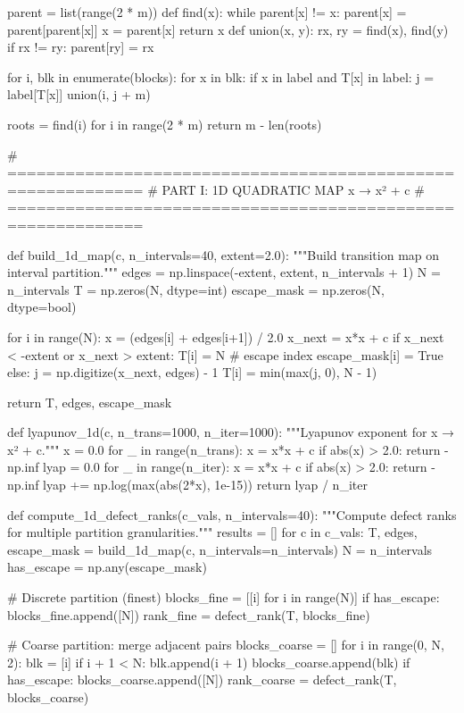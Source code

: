 {{{{{{{{{{{{{    parent = list(range(2 * m))
    def find(x):
        while parent[x] != x:
            parent[x] = parent[parent[x]]
            x = parent[x]
        return x
    def union(x, y):
        rx, ry = find(x), find(y)
        if rx != ry:
            parent[ry] = rx
    
    for i, blk in enumerate(blocks):
        for x in blk:
            if x in label and T[x] in label:
                j = label[T[x]]
                union(i, j + m)
    
    roots = {find(i) for i in range(2 * m)}
    return m - len(roots)


# ============================================================
# PART I: 1D QUADRATIC MAP  x → x² + c
# ============================================================

def build_1d_map(c, n_intervals=40, extent=2.0):
    """Build transition map on interval partition."""
    edges = np.linspace(-extent, extent, n_intervals + 1)
    N = n_intervals
    T = np.zeros(N, dtype=int)
    escape_mask = np.zeros(N, dtype=bool)
    
    for i in range(N):
        x = (edges[i] + edges[i+1]) / 2.0
        x_next = x*x + c
        if x_next < -extent or x_next > extent:
            T[i] = N  # escape index
            escape_mask[i] = True
        else:
            j = np.digitize(x_next, edges) - 1
            T[i] = min(max(j, 0), N - 1)
    
    return T, edges, escape_mask


def lyapunov_1d(c, n_trans=1000, n_iter=1000):
    """Lyapunov exponent for x → x² + c."""
    x = 0.0
    for _ in range(n_trans):
        x = x*x + c
        if abs(x) > 2.0:
            return -np.inf
    lyap = 0.0
    for _ in range(n_iter):
        x = x*x + c
        if abs(x) > 2.0:
            return -np.inf
        lyap += np.log(max(abs(2*x), 1e-15))
    return lyap / n_iter


def compute_1d_defect_ranks(c_vals, n_intervals=40):
    """Compute defect ranks for multiple partition granularities."""
    results = []
    for c in c_vals:
        T, edges, escape_mask = build_1d_map(c, n_intervals=n_intervals)
        N = n_intervals
        has_escape = np.any(escape_mask)
        
        # Discrete partition (finest)
        blocks_fine = [[i] for i in range(N)]
        if has_escape:
            blocks_fine.append([N])
        rank_fine = defect_rank(T, blocks_fine)
        
        # Coarse partition: merge adjacent pairs
        blocks_coarse = []
        for i in range(0, N, 2):
            blk = [i]
            if i + 1 < N:
                blk.append(i + 1)
            blocks_coarse.append(blk)
        if has_escape:
            blocks_coarse.append([N])
        rank_coarse = defect_rank(T, blocks_coarse)
        
}}}}}}}}}}}}}
